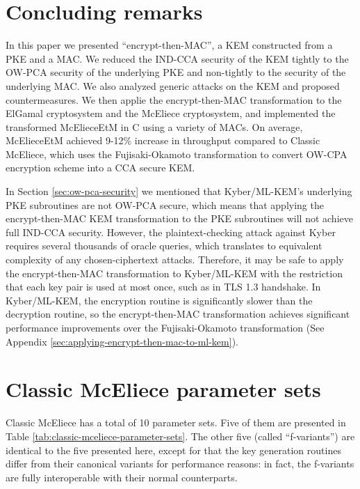 \documentclass[runningheads]{llncs}
\begin{document}
\section{Concluding remarks}\label{sec:conclusion}
In this paper we presented ``encrypt-then-MAC'', a KEM constructed from a PKE and a MAC. We reduced the IND-CCA security of the KEM tightly to the OW-PCA security of the underlying PKE and non-tightly to the security of the underlying MAC. We also analyzed generic attacks on the KEM and proposed countermeasures. We then applie the encrypt-then-MAC transformation to the ElGamal cryptosystem and the McEliece cryptosystem, and implemented the transformed McElieceEtM in C using a variety of MACs. On average, McElieceEtM achieved 9-12\% increase in throughput compared to Classic McEliece, which uses the Fujisaki-Okamoto transformation to convert OW-CPA encryption scheme into a CCA secure KEM.

In Section \ref{sec:ow-pca-security} we mentioned that Kyber/ML-KEM's underlying PKE subroutines are not OW-PCA secure, which means that applying the encrypt-then-MAC KEM transformation to the PKE subroutines will not achieve full IND-CCA security. However, the plaintext-checking attack against Kyber requires several thousands of oracle queries, which translates to equivalent complexity of any chosen-ciphertext attacks. Therefore, it may be safe to apply the encrypt-then-MAC transformation to Kyber/ML-KEM with the restriction that each key pair is used at most once, such as in TLS 1.3 handshake. In Kyber/ML-KEM, the encryption routine is significantly slower than the decryption routine, so the encrypt-then-MAC transformation achieves significant performance improvements over the Fujisaki-Okamoto transformation (See Appendix \ref{sec:applying-encrypt-then-mac-to-ml-kem}).





\appendix
\section{Classic McEliece parameter sets}\label{sec:classic-mceliece-parameter-sets}
Classic McEliece has a total of 10 parameter sets. Five of them are presented in Table \ref{tab:classic-mceliece-parameter-sets}. The other five (called ``f-variants'') are identical to the five presented here, except for that the key generation routines differ from their canonical variants for performance reasons: in fact, the f-variants are fully interoperable with their normal counterparts.
\end{document}
